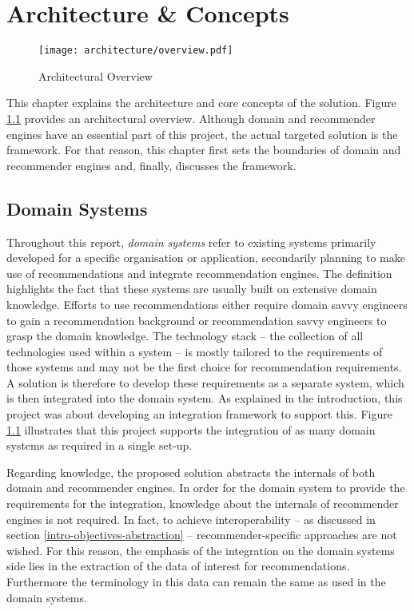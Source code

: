 \chapter{Architecture \& Concepts}

\begin{figure}[ht]
    \texttt{[image: architecture/overview.pdf]}
    \caption{Architectural Overview}
    \label{fig:architecture}
\end{figure}

This chapter explains the architecture and core concepts of the solution. Figure \ref{fig:architecture} provides an architectural overview. Although domain and recommender engines have an essential part of this project, the actual targeted solution is the framework. For that reason, this chapter first sets the boundaries of domain and recommender engines and, finally, discusses the framework.

\section{Domain Systems}
\label{architecture-domain-systems}

Throughout this report, \emph{domain systems} refer to existing systems primarily developed for a specific organisation or application, secondarily planning to make use of recommendations and integrate recommendation engines. The definition highlights the fact that these systems are usually built on extensive domain knowledge. Efforts to use recommendations either require domain savvy engineers to gain a recommendation background or recommendation savvy engineers to grasp the domain knowledge. The technology stack -- the collection of all technologies used within a system -- is mostly tailored to the requirements of those systems and may not be the first choice for recommendation requirements. A solution is therefore to develop these requirements as a separate system, which is then integrated into the domain system. As explained in the introduction, this project was about developing an integration framework to support this. Figure \ref{fig:architecture} illustrates that this project supports the integration of as many domain systems as required in a single set-up.

Regarding knowledge, the proposed solution abstracts the internals of both domain and recommender engines. In order for the domain system to provide the requirements for the integration, knowledge about the internals of recommender engines is not required. In fact, to achieve interoperability -- as discussed in section \ref{intro-objectives-abstraction} -- recommender-specific approaches are not wished. For this reason, the emphasis of the integration on the domain systems side lies in the extraction of the data of interest for recommendations. Furthermore the terminology in this data can remain the same as used in the domain systems.

